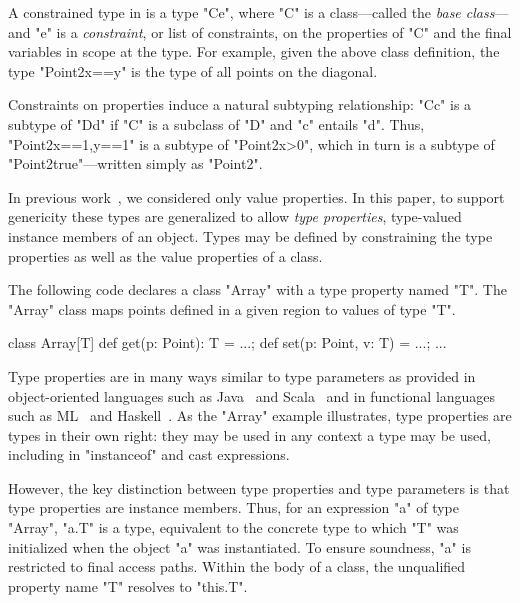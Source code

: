 A constrained type in \Xten{} is a type \xcd"C{e}", where \xcd"C" is a
class---called the \emph{base class}---and \xcd"e" is a
\emph{constraint}, or list of constraints, on the properties of
\xcd"C" and the final variables in scope at the type.
For example, given the above class definition,
the type \xcd"Point2{x==y}" is the type of all
points on the diagonal.


Constraints on properties induce a natural subtyping relationship:
\xcd"C{c}" is a subtype of
\xcd"D{d}" if \xcd"C" is a subclass of \xcd"D" and
\xcd"c" entails \xcd"d".  Thus, \xcd"Point2{x==1,y==1}"
is a subtype of \xcd"Point2{x>0}", which in turn is a subtype of
\xcd"Point2{true}"---written simply as \xcd"Point2".

In previous
work~\cite{X10,constrained-types}, we considered
only value properties.
In this paper,
to support genericity these types are generalized
to allow \emph{type properties}, type-valued instance
members of an object.
Types may be defined by constraining the type properties as
well as the value properties of a class.

The following code declares a class \xcd"Array" with a type
property named \xcd"T".
The \xcd"Array" class maps points defined in a given region
to values of type \xcd"T".
\begin{xten}
class Array[T] {
  def get(p: Point): T = ...;
  def set(p: Point, v: T) = ...;
  ...
}
\end{xten}


Type properties are in many ways similar to
type parameters as provided in object-oriented languages such as
Java~\cite{Java3} and Scala~\cite{scala} and in functional
languages such as ML~\cite{ml} and
Haskell~\cite{haskell}.
%
As the \xcd"Array" example illustrates,
type properties are types in their own right:
they may be used in any context a type may be used,
including in \xcd"instanceof" and cast expressions.

However, the key distinction between type properties
and type parameters is that type properties are instance
members.
Thus, for an expression \xcd"a" of type \xcd"Array", \xcd"a.T" is
a type, equivalent to the concrete type to which \xcd"T" was
initialized when the object \xcd"a" was instantiated.
To ensure
soundness, \xcd"a" is restricted to final access paths.
Within the body of a class, the unqualified property name \xcd"T" resolves
to \xcd"this.T".

